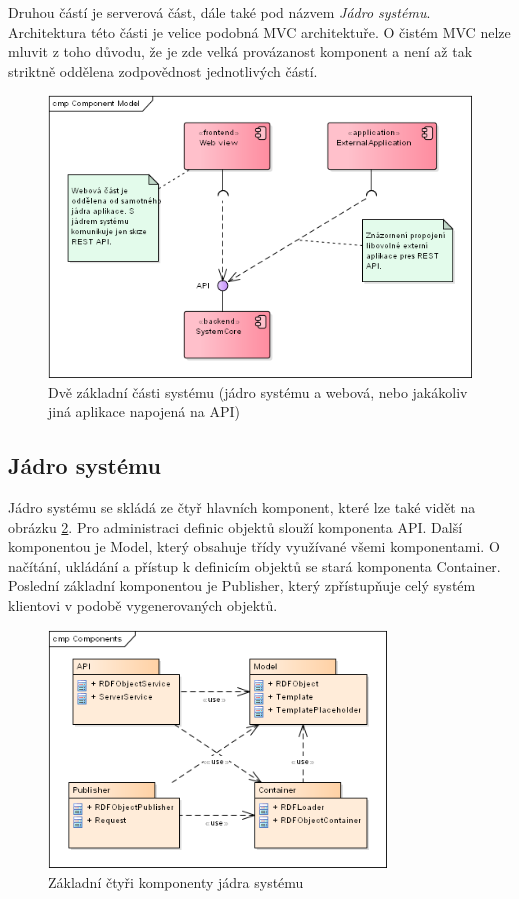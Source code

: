 \documentclass[thesis=B,czech]{FITthesis}[2012/06/26]
\begin{document}
  Druhou částí je serverová část, dále také pod názvem \textit{Jádro systému}. Architektura této části je velice podobná MVC architektuře. O čistém MVC nelze 
  mluvit z toho důvodu, že je zde velká provázanost komponent a není až tak striktně oddělena zodpovědnost jednotlivých částí.
  
  \begin{figure}\centering
 	\includegraphics[width=1\textwidth]{parts}
 	\caption[Model tříd]{Dvě základní části systému (jádro systému a webová, nebo jakákoliv jiná aplikace napojená na API)}\label{parts}
 \end{figure}
  
  \subsection{Jádro systému}  
  Jádro systému se skládá ze čtyř hlavních komponent, které lze také vidět na obrázku \ref{packages_core}. Pro administraci definic objektů slouží komponenta API. Další komponentou je Model, který obsahuje
  třídy využívané všemi komponentami. O načítání, ukládání a přístup k definicím objektů se stará komponenta Container.
  Poslední základní komponentou je Publisher, který zpřístupňuje celý systém klientovi v podobě vygenerovaných objektů.
  
  
  \begin{figure}\centering
 	\includegraphics[width=0.8\textwidth]{packages_core}
 	\caption[Model komponent]{Základní čtyři komponenty jádra systému}\label{packages_core}
 \end{figure}
  
\end{document}
